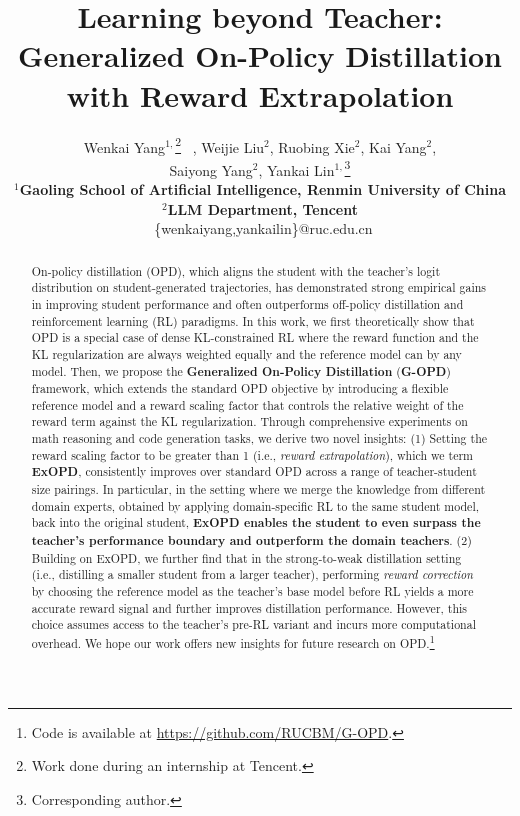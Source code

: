 \documentclass{article} %
\title{Learning beyond Teacher: Generalized On-Policy Distillation\\ with Reward Extrapolation}
\author{
Wenkai Yang$^{1,}$\thanks{Work done during an internship at Tencent.} \ , Weijie Liu$^{2}$, Ruobing Xie$^{2}$, Kai Yang$^{2}$, \\ Saiyong Yang$^2$, Yankai Lin$^{1,}$\thanks{Corresponding author.}\\ 
\textbf{$^1$Gaoling School of Artificial Intelligence, Renmin University of China} \\ \textbf{$^2$LLM Department, Tencent}\\
\Letter~\{wenkaiyang,yankailin\}@ruc.edu.cn\\
}
\begin{document}
\maketitle
\let\oldthefootnote\thefootnote


\let\thefootnote\oldthefootnote

\begin{abstract}
On-policy distillation (OPD), which aligns the student with the teacher's logit distribution on student-generated trajectories, has demonstrated strong empirical gains in improving student performance and often outperforms off-policy distillation and reinforcement learning (RL) paradigms. In this work, we first theoretically show that OPD is a special case of dense KL-constrained RL where the reward function and the KL regularization are always weighted equally and the reference model can by any model. Then, we propose the \textbf{Generalized On-Policy Distillation} (\textbf{G-OPD}) framework, which extends the standard OPD objective by introducing a flexible reference model and a reward scaling factor that controls the relative weight of the reward term against the KL regularization. Through comprehensive experiments on math reasoning and code generation tasks, we derive two novel insights: (1) Setting the reward scaling factor to be greater than 1 (i.e., \emph{reward extrapolation}), which we term \textbf{ExOPD}, consistently improves over standard OPD across a range of teacher-student size pairings. In particular, in the setting where we merge the knowledge from different domain experts, obtained by applying domain-specific RL to the same student model, back into the original student, \textbf{ExOPD enables the student to even surpass the teacher's performance boundary and outperform the domain teachers}. (2) Building on ExOPD, we further find that in the strong-to-weak distillation setting (i.e., distilling a smaller student from a larger teacher), performing \emph{reward correction} by choosing the reference model as the teacher's base model before RL yields a more accurate reward signal and further improves distillation performance. However, this choice assumes access to the teacher's pre-RL variant and incurs more computational overhead. We hope our work offers new insights for future research on OPD.\footnote{Code is available at \url{https://github.com/RUCBM/G-OPD}.}~
\end{abstract}
\end{document}
